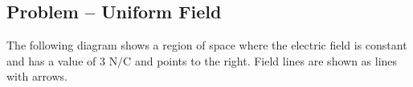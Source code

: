 \documentclass{article}
\newcommand{\bfvec}[1]{\vec{\mathbf{#1}}}
\begin{document}













\newpage

\subsection{Problem -- Uniform Field}

The following diagram shows a region of space where the electric field is constant and has a value of $3\text{ N/C}$ and points to the right. Field lines are shown as lines with arrows.


\end{document}
